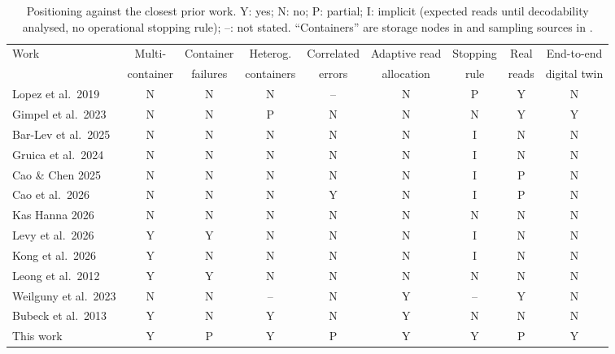 \begin{table}[!t]
\centering
\caption{Positioning against the closest prior work.  Y: yes; N: no; P: partial; I: implicit (expected reads until
decodability analysed, no operational stopping rule); --: not stated.  ``Containers'' are storage nodes in
\cite{leong2012distributed} and sampling sources in \cite{bubeck2013optimal}.}
\label{tab:literature_comparison}
\footnotesize
\setlength{\tabcolsep}{4pt}
\begin{tabular}{@{}lcccccccc@{}}
\toprule
Work & Multi- & Container & Heterog. & Correlated & Adaptive read & Stopping & Real & End-to-end \\
     & container & failures & containers & errors & allocation & rule & reads & digital twin \\
\midrule
Lopez et al.\ 2019 \cite{lopez2019dna}             & N & N & N & -- & N & P & Y & N \\
Gimpel et al.\ 2023 \cite{gimpel2023digital}       & N & N & P & N  & N & N & Y & Y \\
Bar-Lev et al.\ 2025 \cite{barlev2025cover}        & N & N & N & N  & N & I & N & N \\
Gruica et al.\ 2024 \cite{gruica2024combinatorial} & N & N & N & N  & N & I & N & N \\
Cao \& Chen 2025 \cite{cao2025optimizing}          & N & N & N & N  & N & I & P & N \\
Cao et al.\ 2026 \cite{cao2026modeling}            & N & N & N & Y  & N & I & P & N \\
Kas Hanna 2026 \cite{kashanna2026reliability}      & N & N & N & N  & N & N & N & N \\
Levy et al.\ 2026 \cite{levy2026expected}          & Y & Y & N & N  & N & I & N & N \\
Kong et al.\ 2026 \cite{kong2026coverage}          & Y & N & N & N  & N & I & N & N \\
Leong et al.\ 2012 \cite{leong2012distributed}     & Y & Y & N & N  & N & N & N & N \\
Weilguny et al.\ 2023 \cite{weilguny2023dynamic}   & N & N & -- & N & Y & -- & Y & N \\
Bubeck et al.\ 2013 \cite{bubeck2013optimal}       & Y & N & Y & N  & Y & N & N & N \\
\midrule
This work                                          & Y & P & Y & P  & Y & Y & P & Y \\
\bottomrule
\end{tabular}


\end{table}
